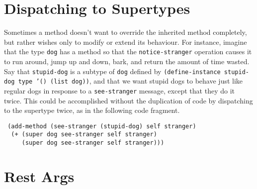 


\section{Dispatching to Supertypes}

Sometimes a method doesn't want to override the inherited method
completely, but rather wishes only to modify or extend its
behaviour.  For instance, imagine that the type \texttt{dog} has a method
so that the \texttt{notice-stranger} operation causes it to run around,
jump up and down, bark, and return the amount of time wasted.  Say
that \texttt{stupid-dog} is a subtype of \texttt{dog} defined by
\texttt{(define-instance stupid-dog type '() (list dog))}, and that we
want stupid dogs to behave just like regular dogs in response to a
\texttt{see-stranger} message, except that they do it twice.  This could
be accomplished without the duplication of code by dispatching to the
supertype twice, as in the following code fragment.
\begin{flushleft}\tt
(add-method (see-stranger (stupid-dog) self stranger)\\
~~(+ ({\upar}super dog see-stranger self stranger)\\
~~~~~({\upar}super dog see-stranger self stranger)))
\end{flushleft}





\section{Rest Args}

